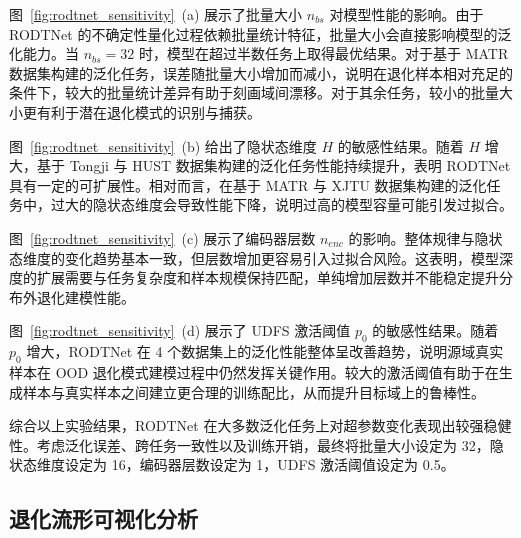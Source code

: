 图~\ref{fig:rodtnet_sensitivity}~(a) 展示了批量大小 $n_{bs}$ 对模型性能的影响。由于 RODTNet 的不确定性量化过程依赖批量统计特征，批量大小会直接影响模型的泛化能力。当 $n_{bs}=32$ 时，模型在超过半数任务上取得最优结果。对于基于 MATR 数据集构建的泛化任务，误差随批量大小增加而减小，说明在退化样本相对充足的条件下，较大的批量统计差异有助于刻画域间漂移。对于其余任务，较小的批量大小更有利于潜在退化模式的识别与捕获。

图~\ref{fig:rodtnet_sensitivity}~(b) 给出了隐状态维度 $H$ 的敏感性结果。随着 $H$ 增大，基于 Tongji 与 HUST 数据集构建的泛化任务性能持续提升，表明 RODTNet 具有一定的可扩展性。相对而言，在基于 MATR 与 XJTU 数据集构建的泛化任务中，过大的隐状态维度会导致性能下降，说明过高的模型容量可能引发过拟合。

图~\ref{fig:rodtnet_sensitivity}~(c) 展示了编码器层数 $n_{enc}$ 的影响。整体规律与隐状态维度的变化趋势基本一致，但层数增加更容易引入过拟合风险。这表明，模型深度的扩展需要与任务复杂度和样本规模保持匹配，单纯增加层数并不能稳定提升分布外退化建模性能。

图~\ref{fig:rodtnet_sensitivity}~(d) 展示了 UDFS 激活阈值 $p_{0}$ 的敏感性结果。随着 $p_{0}$ 增大，RODTNet 在 4 个数据集上的泛化性能整体呈改善趋势，说明源域真实样本在 OOD 退化模式建模过程中仍然发挥关键作用。较大的激活阈值有助于在生成样本与真实样本之间建立更合理的训练配比，从而提升目标域上的鲁棒性。

综合以上实验结果，RODTNet 在大多数泛化任务上对超参数变化表现出较强稳健性。考虑泛化误差、跨任务一致性以及训练开销，最终将批量大小设定为 32，隐状态维度设定为 16，编码器层数设定为 1，UDFS 激活阈值设定为 0.5。

\subsection{退化流形可视化分析}\label{subsec:RODTNet_manifold_analysis}

